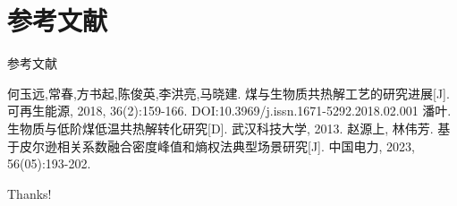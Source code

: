 \documentclass{beamer} %
\begin{document}
\section{参考文献}

\begin{frame}[allowframebreaks]{参考文献}
    \tiny %
    \begin{thebibliography}{9}  
         何玉远,常春,方书起,陈俊英,李洪亮,马晓建. 煤与生物质共热解工艺的研究进展[J]. 可再生能源, 2018, 36(2):159-166. DOI:10.3969/j.issn.1671-5292.2018.02.001    
         潘叶. 生物质与低阶煤低温共热解转化研究[D]. 武汉科技大学, 2013.
         赵源上, 林伟芳. 基于皮尔逊相关系数融合密度峰值和熵权法典型场景研究[J]. 中国电力, 2023, 56(05):193-202.
    \end{thebibliography}
\end{frame}

\begin{frame}
    \begin{center}
        {\Huge\calligra Thanks!} %
    \end{center}
\end{frame}
\end{document}
